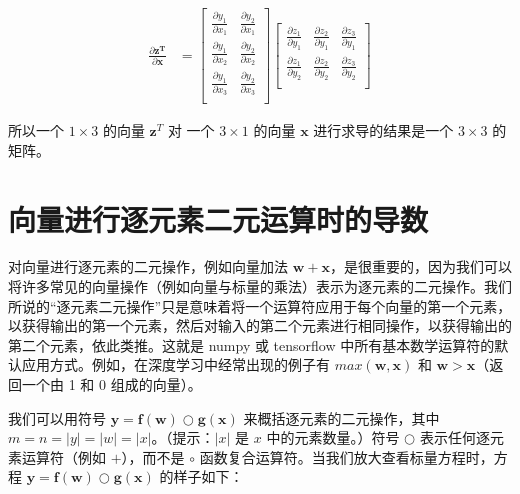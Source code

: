 \documentclass[lang=cn,newtx,10pt,scheme=chinese]{elegantbook}
\begin{document}
\begin{equation*}
  \begin{aligned}
    \frac{\partial \mathbf{z^T}}{\partial \mathbf{x}} &= 
    \begin{bmatrix}
      \frac{\partial y_1}{\partial x_1} & \frac{\partial y_2}{\partial x_1} \\
      \frac{\partial y_1}{\partial x_2} & \frac{\partial y_2}{\partial x_2} \\
      \frac{\partial y_1}{\partial x_3} & \frac{\partial y_2}{\partial x_3} \\
    \end{bmatrix}
    \begin{bmatrix}
      \frac{\partial z_1}{\partial y_1} & \frac{\partial z_2}{\partial y_1} & \frac{\partial z_3}{\partial y_1}\\
      \frac{\partial z_1}{\partial y_2} & \frac{\partial z_2}{\partial y_2} & \frac{\partial z_3}{\partial y_2}\\
    \end{bmatrix}
  \end{aligned}
\end{equation*}

所以一个 $1 \times 3$ 的向量 $\mathbf{z}^T$ 对 一个 $3 \times 1$ 的向量 $\mathbf{x}$ 进行求导的结果是一个 $3 \times 3$ 的矩阵。

\section{向量进行逐元素二元运算时的导数}

对向量进行逐元素的二元操作，例如向量加法 $\mathbf{w} + \mathbf{x}$，是很重要的，因为我们可以将许多常见的向量操作（例如向量与标量的乘法）表示为逐元素的二元操作。我们所说的“逐元素二元操作”只是意味着将一个运算符应用于每个向量的第一个元素，以获得输出的第一个元素，然后对输入的第二个元素进行相同操作，以获得输出的第二个元素，依此类推。这就是 numpy 或 tensorflow 中所有基本数学运算符的默认应用方式。例如，在深度学习中经常出现的例子有 $max(\mathbf{w},\mathbf{x})$ 和 $\mathbf{w} > \mathbf{x}$（返回一个由 1 和 0 组成的向量）。

我们可以用符号 $\mathbf{y} = \mathbf{f(w)} \bigcirc \mathbf{g(x)}$ 来概括逐元素的二元操作，其中 $m=n=|y|=|w|=|x|$。（提示：$|x|$ 是 $x$ 中的元素数量。）符号 $\bigcirc$ 表示任何逐元素运算符（例如 $+$），而不是 $\circ$ 函数复合运算符。当我们放大查看标量方程时，方程 $\mathbf{y} = \mathbf{f(w)} \bigcirc \mathbf{g(x)}$ 的样子如下：
\end{document}
